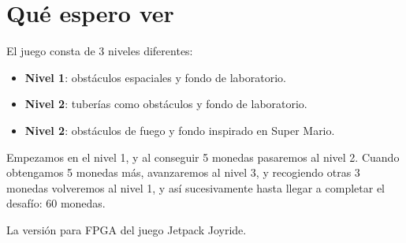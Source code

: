 \documentclass[11pt, a4paper, spanish, openright, twoside]{book}
\begin{document}
\section{Qué espero ver}
El juego consta de 3 niveles diferentes:
\begin{itemize}
	\item \textbf{Nivel 1}: obstáculos espaciales y fondo de laboratorio.
	\item \textbf{Nivel 2}: tuberías como obstáculos y fondo de laboratorio.
	\item \textbf{Nivel 2}: obstáculos de fuego y fondo inspirado en Super Mario.
\end{itemize}
Empezamos en el nivel 1, y al conseguir 5 monedas pasaremos al nivel 2. Cuando obtengamos 5 monedas más, avanzaremos al nivel 3, y recogiendo otras 3 monedas volveremos al nivel 1, y así sucesivamente hasta llegar a completar el desafío: 60 monedas.

La versión para FPGA del juego Jetpack Joyride. 
\end{document}
